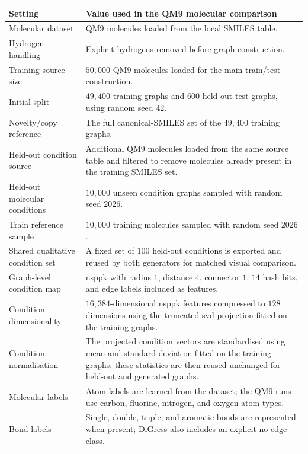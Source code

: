 \begin{table}[p]
\centering
\footnotesize
\begin{tabularx}{\textwidth}{@{}p{}X@{}}
\toprule
Setting & Value used in the QM9 molecular comparison \\
\midrule
Molecular dataset & QM9 molecules loaded from the local SMILES table. \\
Hydrogen handling & Explicit hydrogens removed before graph construction. \\
Training source size & \(50{,}000\) QM9 molecules loaded for the main train/test construction. \\
Initial split & \(49{,}400\) training graphs and \(600\) held-out test graphs, using random seed \(42\). \\
Novelty/copy reference & The full canonical-SMILES set of the \(49{,}400\) training graphs. \\
Held-out condition source & Additional QM9 molecules loaded from the same source table and filtered to remove molecules already present in the training SMILES set. \\
Held-out molecular conditions & \(10{,}000\) unseen condition graphs sampled with random seed \(2026\). \\
Train reference sample & \(10{,}000\) training molecules sampled with random seed \(2026\). \\
Shared qualitative condition set & A fixed set of \(100\) held-out conditions is exported and reused by both generators for matched visual comparison. \\
Graph-level condition map & \gls{nsppk} with radius \(1\), distance \(4\), connector \(1\), \(14\) hash bits, and edge labels included as features. \\
Condition dimensionality & \(16{,}384\)-dimensional \gls{nsppk} features compressed to \(128\) dimensions using the truncated \gls{svd} projection fitted on the training graphs. \\
Condition normalisation & The projected condition vectors are standardised using mean and standard deviation fitted on the training graphs; these statistics are then reused unchanged for held-out and generated graphs. \\
Molecular labels & Atom labels are learned from the dataset; the QM9 runs use carbon, fluorine, nitrogen, and oxygen atom types. \\
Bond labels & Single, double, triple, and aromatic bonds are represented when present; DiGress also includes an explicit no-edge class. \\

\end{tabularx}
\end{table}
